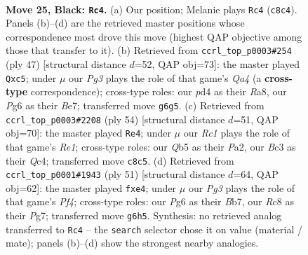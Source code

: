 \documentclass[11pt]{article}
\begin{document}
\clearpage

\begin{figure}[p]\centering
\begin{subfigure}{0.46\textwidth}\centering
\resizebox{\linewidth}{!}{%
\newchessgame
\chessboard[
  setfen={r1r3k1/p4p2/4p1p1/pq1p3P/3P1QP1/2b5/2P5/3K2RR b - - 0 25},
  showmover=false,
  pgfstyle=straightmove, color=movearrow, markmove={c8-c4}
]}
\caption{}
\end{subfigure}\hfill
\begin{subfigure}{0.46\textwidth}\centering
\resizebox{\linewidth}{!}{%
\newchessgame
\chessboard[
  setfen={r3r1k1/p3bp1p/1p4pB/q1P5/3R3P/5QP1/5P2/3R2K1 b - - 0 24},
  showmover=false,
  pgfstyle=straightmove, color=movearrow, markmove={a5-c5}
]}
\caption{}
\end{subfigure}
\\[4pt]
\begin{subfigure}{0.46\textwidth}\centering
\resizebox{\linewidth}{!}{%
\newchessgame
\chessboard[
  setfen={3r2k1/p2r1ppp/1pq5/2P5/2QP1p2/5P2/P5PP/R3R1K1 w - - 6 28},
  showmover=false,
  pgfstyle=straightmove, color=movearrow, markmove={e1-e4}
]}
\caption{}
\end{subfigure}\hfill
\begin{subfigure}{0.46\textwidth}\centering
\resizebox{\linewidth}{!}{%
\newchessgame
\chessboard[
  setfen={6k1/1b1q2p1/1p2p1rp/5p2/1PQ1P3/6P1/5P1P/1BR3K1 b - - 1 26},
  showmover=false,
  pgfstyle=straightmove, color=movearrow, markmove={f5-e4}
]}
\caption{}
\end{subfigure}
\caption{\textbf{Move 25, Black: \texttt{Rc4}.} (a) Our position; Melanie plays \texttt{Rc4} (\texttt{c8c4}). Panels (b)--(d) are the retrieved master positions whose correspondence most drove this move (highest QAP objective among those that transfer to it). (b) Retrieved from \texttt{ccrl\_top\_p0003\#254} (ply 47) [structural distance $d$=52, QAP obj=73]: the master played \texttt{Qxc5}; under $\mu$ our \emph{Pg3} plays the role of that game's \emph{Qa4} (a \textbf{cross-type} correspondence); cross-type roles: our \emph{p}d4 as their \emph{R}a8, our \emph{P}g6 as their \emph{B}e7; transferred move \texttt{g6g5}. (c) Retrieved from \texttt{ccrl\_top\_p0003\#2208} (ply 54) [structural distance $d$=51, QAP obj=70]: the master played \texttt{Re4}; under $\mu$ our \emph{Rc1} plays the role of that game's \emph{Re1}; cross-type roles: our \emph{Q}b5 as their \emph{P}a2, our \emph{B}c3 as their \emph{Q}c4; transferred move \texttt{c8c5}. (d) Retrieved from \texttt{ccrl\_top\_p0001\#1943} (ply 51) [structural distance $d$=64, QAP obj=62]: the master played \texttt{fxe4}; under $\mu$ our \emph{Pg3} plays the role of that game's \emph{Pf4}; cross-type roles: our \emph{P}g6 as their \emph{B}b7, our \emph{R}c8 as their \emph{P}g7; transferred move \texttt{g6h5}. Synthesis: no retrieved analog transferred to \texttt{Rc4} -- the \texttt{search} selector chose it on value (material / mate); panels (b)--(d) show the strongest nearby analogies.}
\label{fig:thought-m49}
\end{figure}
\end{document}

